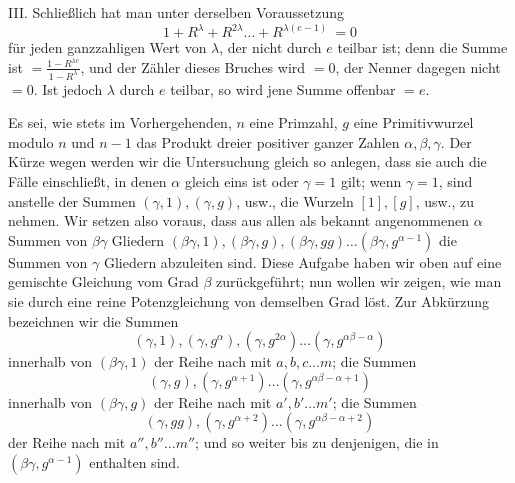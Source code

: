III. Schließlich hat man unter derselben Voraussetzung \[1+R^\lambda+R^{2\lambda}\ldots+R^{\lambda(e-1)}\ =0\] für jeden ganzzahligen Wert von \(\lambda\), der nicht durch \(e\) teilbar ist; denn die Summe ist \(=\frac{1-R^{\lambda e}}{1-R^\lambda}\), und der Zähler dieses Bruches wird \(=0\), der Nenner dagegen nicht \(=0\). Ist jedoch \(\lambda\) durch \(e\) teilbar, so wird jene Summe offenbar \(=e\).

Es sei, wie stets im Vorhergehenden, \(n\) eine Primzahl, \(g\) eine Primitivwurzel modulo \(n\) und \(n-1\) das Produkt dreier positiver ganzer Zahlen \(\alpha,\allowbreak \beta,\allowbreak \gamma\). Der Kürze wegen werden wir die Untersuchung gleich so anlegen, dass sie auch die Fälle einschließt, in denen \(\alpha\) gleich eins ist oder \(\gamma=1\) gilt; wenn \(\gamma=1\), sind anstelle der Summen \((\gamma,1),\allowbreak (\gamma,g)\), usw., die Wurzeln \([1],\allowbreak [g]\), usw., zu nehmen. Wir setzen also voraus, dass aus allen als bekannt angenommenen \(\alpha\) Summen von \(\beta\gamma\) Gliedern \((\beta\gamma,1),\allowbreak (\beta\gamma,g),\allowbreak (\beta\gamma,gg)\ldots(\beta\gamma,g^{\alpha-1})\) die Summen von \(\gamma\) Gliedern abzuleiten sind. Diese Aufgabe haben wir oben auf eine gemischte Gleichung vom Grad \(\beta\) zurückgeführt; nun wollen wir zeigen, wie man sie durch eine reine Potenzgleichung von demselben Grad löst. Zur Abkürzung bezeichnen wir die Summen \[(\gamma,1),(\gamma,g^\alpha),(\gamma,g^{2\alpha})\ldots(\gamma,g^{\alpha\beta-\alpha})\]
innerhalb von \((\beta\gamma,1)\) der Reihe nach mit \(a,\allowbreak b,\allowbreak c\ldots m\); die Summen \[(\gamma,g),(\gamma,g^{\alpha+1})\ldots(\gamma,g^{\alpha\beta-\alpha+1})\] innerhalb von \((\beta\gamma,g)\) der Reihe nach mit \(a',\allowbreak b'\ldots m'\); die Summen \[(\gamma,gg),(\gamma,g^{\alpha+2})\ldots(\gamma,g^{\alpha\beta-\alpha+2})\] der Reihe nach mit \(a'',\allowbreak b''\ldots m''\); und so weiter bis zu denjenigen, die in \((\beta\gamma,g^{\alpha-1})\) enthalten sind.

